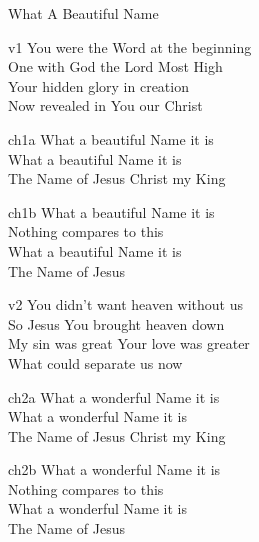 \begin{song}{What A Beautiful Name}

    \begin{songframe}{v1}
        You were the Word at the beginning \\
        One with God the Lord Most High \\
        Your hidden glory in creation \\
        Now revealed in You our Christ
    \end{songframe}

    \begin{songframe}{ch1a}
        What a beautiful Name it is \\
        What a beautiful Name it is \\
        The Name of Jesus Christ my King
    \end{songframe}

    \begin{songframe}{ch1b}
        What a beautiful Name it is \\
        Nothing compares to this \\
        What a beautiful Name it is \\
        The Name of Jesus
    \end{songframe}


    \begin{songframe}{v2}
        You didn't want heaven without us \\
        So Jesus You brought heaven down \\
        My sin was great Your love was greater \\
        What could separate us now
    \end{songframe}


    \begin{songframe}{ch2a}
        What a wonderful Name it is \\
        What a wonderful Name it is \\
        The Name of Jesus Christ my King 
    \end{songframe}

    \begin{songframe}{ch2b}
        What a wonderful Name it is \\
        Nothing compares to this \\
        What a wonderful Name it is \\
        The Name of Jesus
    \end{songframe}


\end{song}
